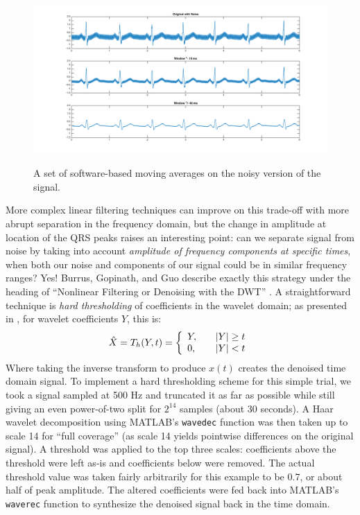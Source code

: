 \documentclass[letterpaper]{article}
\begin{document}
\begin{figure}[h]
  \caption{A set of software-based moving averages on the noisy version of the signal.}
  \centering
    \includegraphics[width=1\textwidth]{figures/ecgmovavg}
  \label{fig:ecgmovavg}
\end{figure}

More complex linear filtering techniques can improve on this trade-off with more abrupt separation in the frequency domain,
but the change in amplitude at location of the QRS peaks raises an interesting point:
can we separate signal from noise by taking into account \emph{amplitude of frequency components at specific times},
when both our noise and components of our signal could be in similar frequency ranges?
Yes!  Burrus, Gopinath, and Guo describe exactly this strategy under the heading of
``Nonlinear Filtering or Denoising with the DWT'' \cite[Sec.~10.3]{burrus}.
A straightforward technique is \emph{hard thresholding} of coefficients in the wavelet domain;
as presented in \cite{burrus}, for wavelet coefficients $Y$, this is:
\[
\hat{X} = T_h(Y,t) = \left\{ 
  \begin{array}{l l}
    Y, & \quad |Y| \ge t \\
    0, & \quad |Y| < t
  \end{array} \right.
\]
Where taking the inverse transform to produce $x(t)$ creates the denoised time domain signal.
To implement a hard thresholding scheme for this simple trial,
we took a signal sampled at 500 Hz and truncated it as far as possible while still giving 
an even power-of-two split for $2^{14}$ samples (about 30 seconds).
A Haar wavelet decomposition using MATLAB's \texttt{wavedec} function was then taken up to scale 14  for ``full coverage''
(as scale 14 yields pointwise differences on the original signal).
A threshold was applied to the top three scales: coefficients above the threshold were left as-is
and coefficients below were removed.
The actual threshold value was taken fairly arbitrarily for this example to be 0.7, or about half of peak amplitude.
The altered coefficients were fed back into MATLAB's \texttt{waverec} function to synthesize the denoised signal back in the time domain.
\end{document}
